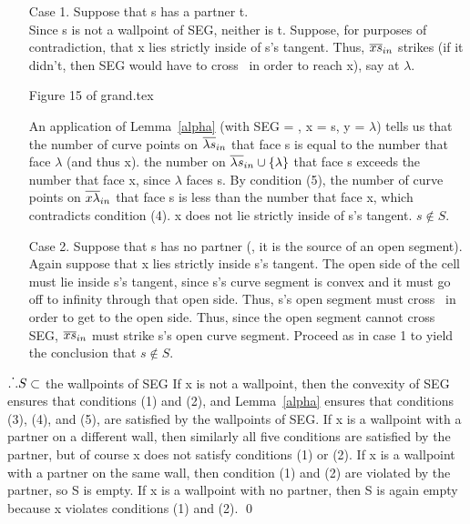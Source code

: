 \begin{enumerate}
      \item[Case 1.] Suppose that s has a partner t.\\
Since s is not a wallpoint of SEG, neither is t.
Suppose, for purposes of contradiction, that x lies strictly inside
of s's tangent.
Thus, $\mbox{$\overline{xs}$}_{in}$ strikes  (if it didn't, then SEG would have
to cross \ in order to reach x), say at $\lambda$.
\begin{center}
Figure 15 of grand.tex
\end{center}
An application of Lemma~\ref{alpha} (with SEG = , x = s, y = $\lambda$)
tells us that the number of curve points on $\mbox{$\overline{\lambda s}$}_{in}$ that face
s is equal to the number that face $\lambda$ (and thus x).
\hence the number on $\mbox{$\overline{\lambda s}$}_{in} \cup \{\lambda\}$ that face s exceeds
the number that face x, since $\lambda$ faces s.
\hence By condition (5), the number of curve points on $\mbox{$\overline{x\lambda}$}_{in}$
that face s is less than the number that face x, which contradicts 
condition (4).
\hence x does not lie strictly inside of s's tangent.
\hence $s \not\in S$.
     \item[Case 2.] Suppose that s has no partner (\ie, it is the source of an
open segment).
Again suppose that x lies strictly inside s's tangent.
The open side of the cell must lie inside s's tangent, since s's curve segment
is convex and it must go off to infinity through that open side.
Thus, s's open segment must cross \ in order to get to the open side.
Thus, since the open segment cannot cross SEG,
$\mbox{$\overline{xs}$}_{in}$ must strike s's open curve segment.
Proceed as in case 1 to yield the conclusion that $s \not\in S$.
\end{enumerate}
$.\raisebox {1.5ex}{.}. S \subset$ {the wallpoints of SEG}
If x is not a wallpoint, then the convexity of SEG ensures that
conditions (1) and (2), and Lemma~\ref{alpha} ensures that 
conditions (3), (4), and (5), are satisfied by the wallpoints of SEG.
If x is a wallpoint with a partner on a different wall, then similarly
all five conditions are satisfied by the partner, but of course x does not
satisfy conditions (1) or (2).
If x is a wallpoint with a partner on the same wall, then condition (1) and
(2) are violated by the partner, so S is empty.
If x is a wallpoint with no partner, then S is again empty because x violates
conditions (1) and (2).
\qed
